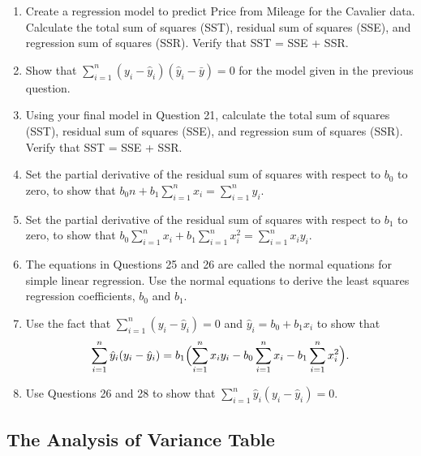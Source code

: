 \documentclass[
]{report}
\providecommand{\tightlist}{%
  \setlength{\itemsep}{0pt}\setlength{\parskip}{0pt}}
\begin{document}
\begin{enumerate}
\def\labelenumi{\arabic{enumi}.}
\setcounter{enumi}{21}
\tightlist
\item
  Create a regression model to predict Price from Mileage for the Cavalier data. Calculate the total sum of squares (SST), residual sum of squares (SSE), and regression sum of squares (SSR). Verify that SST = SSE + SSR.\\
\item
  Show that \(\sum_{i=1}^n (y_i - \hat{y}_i)(\hat{y}_i - \bar{y}) = 0\) for the model given in the previous question.\\
\item
  Using your final model in Question 21, calculate the total sum of squares (SST), residual sum of squares (SSE), and regression sum of squares (SSR). Verify that SST = SSE + SSR.\\
\item
  Set the partial derivative of the residual sum of squares with respect to \(b_0\) to zero, to show that \(b_0 n + b_1 \sum_{i=1}^n x_i = \sum_{i=1}^n y_i.\)
\item
  Set the partial derivative of the residual sum of squares with respect to \(b_1\) to zero, to show that \(b_0 \sum_{i=1}^n x_i + b_1 \sum_{i=1}^n x_i^2 = \sum_{i=1}^n x_i y_i.\)
\item
  The equations in Questions 25 and 26 are called the normal equations for simple linear regression. Use the normal equations to derive the least squares regression coefficients, \(b_0\) and \(b_1\).\\
\item
  Use the fact that \(\sum_{i=1}^n (y_i - \hat{y}_i) = 0\) and \(\hat{y}_i = b_0 + b_1 x_i\) to show that
  \begin{equation}
  \sum_{i=1}^n \hat{y}_i (y_i - \hat{y}_i)
    = b_1 \Bigl(\sum_{i=1}^n x_i y_i - b_0 \sum_{i=1}^n x_i - b_1 \sum_{i=1}^n x_i^2\Bigr). \notag
  \end{equation}
\item
  Use Questions 26 and 28 to show that \(\sum_{i=1}^n \hat{y}_i (y_i - \hat{y}_i) = 0.\)
\end{enumerate}

\subsection*{The Analysis of Variance Table}\label{the-analysis-of-variance-table}
\end{document}
